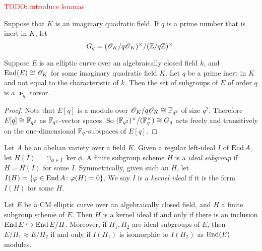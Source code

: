 \documentclass{amsart}
\begin{document}
\textcolor{red}{TODO: introduce lemmas}

\begin{definition}
  Suppose that $K$ is an imaginary quadratic field. If $q$ is a prime number that is inert in $K$, let
  $$G_q=(\mathscr{O}_K/q\mathscr{O}_K)^\times/(\mathbb{Z}/q\mathbb{Z})^\times. $$
\end{definition}

\begin{lemma}\label{lem:c-torsor}
  Suppose $E$ is an elliptic curve over an algebraically closed field $k$, and $\operatorname{End}(E) \cong \mathscr{O}_K$ for some imaginary quadratic field $K$. Let $q$ be a prime inert in $K$ and not equal to the characteristic of $k$. Then the set of subgroups of $E$ of order $q$ is a $\Gt_q$ torsor.
\end{lemma}
\begin{proof}
  Note that $E[q]$ is a module over $\mathscr{O}_K/q\mathscr{O}_K \cong \mathbb{F}_{q^2}$  of size $q^2$. Therefore $E[q] \cong \mathbb{F}_{q^2}$ as $\mathbb{F}_{q^2}$-vector spaces. So $(\mathbb{F}_{q^2})^\times/(\mathbb{F}_q^\times) \cong G_q$ acts freely and transitively on the one-dimensional $\mathbb{F}_q$-subspaces of $E[q]$.
\end{proof}

\begin{definition}\label{def:ker-idl}
  Let $A$ be an abelian variety over a field $K$. Given a regular left-ideal $I$ of $\operatorname{End} A$, let $H(I) = \cap_{\phi \in I}\ker \phi$. A finite subgroup scheme $H$ is a \emph{ideal subgroup} if $H = H(I)$ for some $I$. Symmetrically, given such an $H$, let $I(H) = \{\varphi \in \operatorname{End} A \colon \varphi(H) = 0\}$. We say $I$ is a \emph{kernel ideal} if it is the form $I(H)$ for some $H$.
\end{definition}

\begin{theorem}\label{thm:kani-20b}
  Let $E$ be a CM elliptic curve over an algebraically closed field, and $H$ a finite subgroup scheme of $E$. Then $H$ is a kernel ideal if and only if there is an inclusion $\operatorname{End} E \hookrightarrow \operatorname{End} E/H$. Moreover, if $H_1,H_2$ are ideal subgroups of $E$, then $E/H_1 \approx E/H_2$ if and only if $I(H_1)$ is isomorphic to $I(H_2)$ as $\operatorname{End}(E)$ modules.
\end{theorem}
\end{document}
